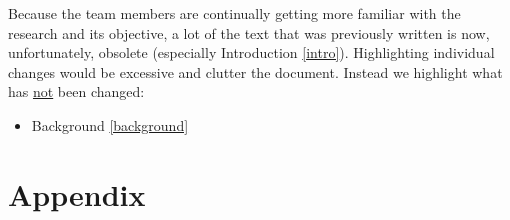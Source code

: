 \documentclass[conference]{IEEEtran}
\begin{document}
\noindent
Because the team members are continually getting more familiar with the research
and its objective, a lot of the text that was previously written is now,
unfortunately, obsolete (especially Introduction \ref{intro}). Highlighting
individual changes would be excessive and clutter the document. Instead we
highlight what has \underline{not} been changed:

\begin{itemize}
    \item Background \ref{background}
\end{itemize}







\section*{Appendix}\label{appendix}
\end{document}
